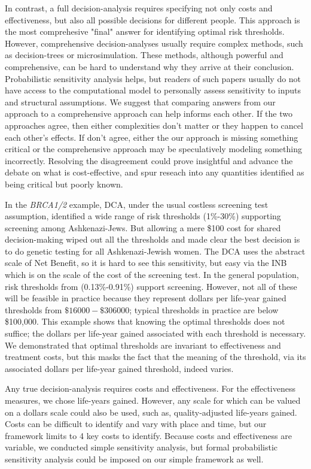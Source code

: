 \documentclass[AMA,STIX1COL]{WileyNJD-v2}
\begin{document}
In contrast, a full decision-analysis requires specifying not only costs and effectiveness, but also all possible decisions for different people.  This approach is the most comprehesive "final" answer for identifying optimal risk thresholds.  However, comprehensive decision-analyses usually require complex methods, such as decision-trees or microsimulation.  These methods, although powerful and comprehensive, can be hard to understand why they arrive at their conclusion.  Probabilistic sensitivity analysis helps, but readers of such papers usually do not have access to the computational model to personally assess sensitivity to inputs and structural assumptions.  We suggest that comparing answers from our approach to a comprehensive approach can help informs each other.  If the two approaches agree, then either complexities don't matter or they happen to cancel each other's effects.  If don't agree, either the our approach is missing something critical or the comprehensive approach may be speculatively modeling something incorrectly.  Resolving the disagreement could prove insightful and advance the debate on what is cost-effective, and spur reseach into any quantities identified as being critical but poorly known.

In the \textit{BRCA1/2} example, DCA, under the usual costless screening test assumption, identified a wide range of risk thresholds (1\%-30\%) supporting screening among Ashkenazi-Jews.  But allowing a mere \$100 cost for shared decision-making wiped out all the thresholds and made clear the best decision is to do genetic testing for all Ashkenazi-Jewish women.  The DCA uses the abstract scale of Net Benefit, so it is hard to see this sensitivity, but easy via the INB which is on the scale of the cost of the screening test.  In the general population, risk thresholds from (0.13\%-0.91\%) support screening.  However, not all of these will be feasible in practice because they represent dollars per life-year gained thresholds from $\$16000-\$306000$; typical thresholds in practice are below \$100,000.   This example shows that knowing the optimal thresholds does not suffice; the dollars per life-year gained associated with each threshold is necessary.  We demonstrated that optimal thresholds are invariant to effectiveness and treatment costs, but this masks the fact that the meaning of the threshold, via its associated dollars per life-year gained threshold, indeed varies.

Any true decision-analysis requires costs and effectiveness.  For the effectiveness measures, we chose life-years gained.  However, any scale for which can be valued on a dollars scale could also be used, such as, quality-adjusted life-years gained.  Costs can be difficult to identify and vary with place and time, but our framework limits to 4 key costs to identify.  Because costs and effectiveness are variable, we conducted simple sensitivity analysis, but formal probabilistic sensitivity analysis could be imposed on our simple framework as well.
\end{document}
